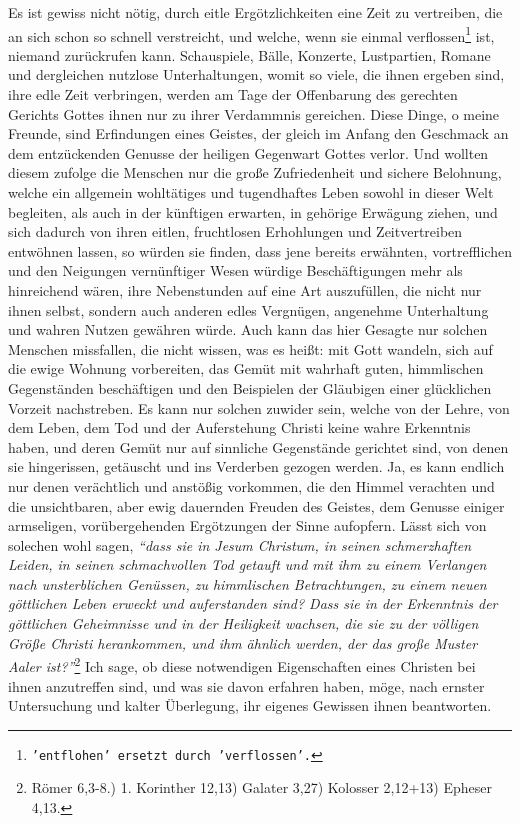 Es ist gewiss nicht nötig, durch eitle Ergötzlichkeiten eine Zeit zu vertreiben,
die an sich schon so schnell verstreicht, und welche, wenn sie einmal
verflossen\footnote{\texttt{'entflohen' ersetzt
durch 'verflossen'.}}
ist, niemand zurückrufen kann. Schauspiele,
Bälle, Konzerte, Lustpartien, Romane
und dergleichen nutzlose Unterhaltungen, womit so viele, die ihnen ergeben sind,
ihre edle Zeit verbringen, werden am Tage der Offenbarung des gerechten Gerichts
Gottes ihnen nur zu ihrer Verdammnis
gereichen.
Diese Dinge, o meine Freunde,
sind Erfindungen eines Geistes, der gleich im Anfang den Geschmack an dem
entzückenden Genusse der heiligen Gegenwart Gottes verlor. Und wollten diesem
zufolge die Menschen nur die große Zufriedenheit und sichere Belohnung, welche
ein allgemein wohltätiges und tugendhaftes Leben sowohl in
dieser Welt
begleiten, als auch in der künftigen erwarten, in gehörige Erwägung ziehen, und
sich dadurch von ihren eitlen, fruchtlosen Erhohlungen und Zeitvertreiben
entwöhnen lassen, so würden sie finden, dass jene bereits erwähnten,
vortrefflichen und den Neigungen vernünftiger Wesen würdige Beschäftigungen
mehr als hinreichend wären, ihre Nebenstunden auf eine Art auszufüllen, die
nicht nur ihnen selbst, sondern auch anderen edles Vergnügen, angenehme
Unterhaltung und wahren Nutzen gewähren würde. Auch kann das hier Gesagte nur
solchen Menschen missfallen, die nicht wissen, was es heißt: mit Gott wandeln,
sich auf die ewige Wohnung vorbereiten, das Gemüt mit
wahrhaft guten,
himmlischen Gegenständen beschäftigen und den Beispielen der Gläubigen einer
glücklichen Vorzeit nachstreben. Es kann nur solchen zuwider sein, welche von
der Lehre, von dem Leben, dem Tod und der Auferstehung
Christi keine
wahre
Erkenntnis haben, und deren Gemüt nur auf sinnliche Gegenstände gerichtet
sind, von denen sie hingerissen, getäuscht und ins Verderben
gezogen werden. Ja,
es kann endlich nur denen verächtlich und anstößig vorkommen, die den Himmel
verachten und die unsichtbaren, aber ewig dauernden Freuden des Geistes, dem
Genusse einiger armseligen, vorübergehenden Ergötzungen der Sinne aufopfern.
Lässt sich von solechen wohl sagen,
\textit{"`dass sie in Jesum Christum, in seinen
schmerzhaften Leiden, in seinen schmachvollen Tod getauft und mit ihm zu einem
Verlangen nach unsterblichen Genüssen, zu himmlischen Betrachtungen, zu einem
neuen göttlichen Leben erweckt und auferstanden sind? Dass sie in der
Erkenntnis der göttlichen Geheimnisse und in der Heiligkeit wachsen, die sie
zu der völligen Größe Christi herankommen, und ihm ähnlich werden, der das große
Muster Aaler ist?"'}\footnote{Römer 6,3-8.) 1. Korinther 12,13) Galater 3,27)
Kolosser 2,12+13)
Epheser 4,13.}
Ich sage, ob diese notwendigen Eigenschaften eines Christen bei
ihnen anzutreffen sind, und was sie davon erfahren haben, möge, nach ernster
Untersuchung und kalter Überlegung, ihr eigenes Gewissen ihnen beantworten.

